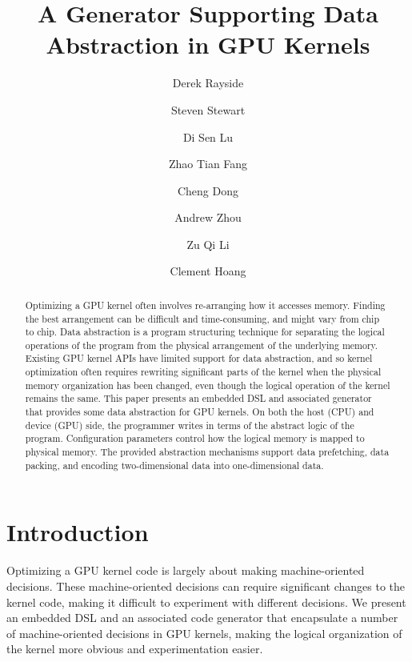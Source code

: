 \documentclass[conference]{IEEEtran}
\begin{document}
\title{\huge A Generator Supporting Data Abstraction in GPU Kernels}

\author{Derek Rayside}
\author{Steven Stewart}
\author{Di Sen Lu}
\author{Zhao Tian Fang}
\author{Cheng Dong}
\author{Andrew Zhou}
\author{Zu Qi Li}
\author{Clement Hoang}

\renewcommand\Authands{ and }


\maketitle

\begin{abstract}
Optimizing a GPU kernel often involves re-arranging how it accesses memory. Finding the best arrangement can be difficult and time-consuming, and might vary from chip to chip. Data abstraction is a program structuring technique for separating the logical operations of the program from the physical arrangement of the underlying memory. Existing GPU kernel APIs have limited support for data abstraction, and so kernel optimization often requires rewriting significant parts of the kernel when the physical memory organization has been changed, even though the logical operation of the kernel remains the same. This paper presents an embedded DSL and associated generator that provides some data abstraction for GPU kernels. On both the host (CPU) and device (GPU) side, the programmer writes in terms of the abstract logic of the program. Configuration parameters control how the logical memory is mapped to physical memory. The provided abstraction mechanisms support data prefetching, data packing, and encoding two-dimensional data into one-dimensional data.
\end{abstract}

\section{Introduction}
Optimizing a GPU kernel code is largely about making machine-oriented decisions. These machine-oriented decisions can require significant changes to the kernel code, making it difficult to experiment with different decisions. We present an embedded DSL and an associated code generator that encapsulate a number of machine-oriented decisions in GPU kernels, making the logical organization of the kernel more obvious and experimentation easier. 
\end{document}
